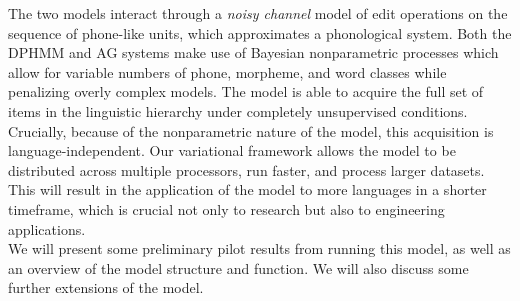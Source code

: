\documentclass[12pt,letterpaper]{article}
\newif\ifcomments
\newcommand{\cm}[1]{\textcolor{purple}{\ifcomments[COMMENT: #1]\else\fi}}
\begin{document}
The two models interact through a \textit{noisy channel}
 model of edit operations on the sequence of phone-like units, which approximates a phonological system. Both the DPHMM and AG systems make use of Bayesian nonparametric processes which allow for variable numbers of phone, morpheme, and word classes while penalizing overly complex models.
The model is able to acquire the full set of items in the linguistic hierarchy under completely unsupervised conditions. Crucially, because of the nonparametric nature of the model, this acquisition is language-independent.\cm{Ok, sorry that I didn't catch this before, but these preceding sentences are all description of the model and belongs above, with that, before we start explaining the new inference. It is important to maintain roughly a single ``point'' per paragraph.} Our variational framework allows the model to be distributed across multiple processors, run faster, and process larger datasets.\cm{It occurs to me that the novel part of the ULD model was the noisy channel and the novel part of this work is our soon-to-be-developed VB noisy-channel inference. We can say that ``we develop efficient variational inference by building on the VB blah blah described for AGs in blah and for DPHMMS in bleen extending ths with a novel approach to variational inference for the noisy-blerg, blah''}
 This will result in the application of the model to more languages in a shorter timeframe, which is crucial not only to research but also to engineering applications.\cm{No need for this last sentence, it is sort of obvious.}  \\
We will present some preliminary pilot results from running this model, as well as an overview of the model structure and function. We will also discuss some further extensions of the model.\cm{Don't promise any results, just say we will present the algorithm for now.}
\end{document}
